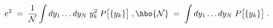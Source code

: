 \begin{equation} 
e^2 \; = \; \frac{1}{\cal N} \int dy_1 \ldots dy_N \; y_k^2 \; 
P\bigl[ \{ y_k \} \bigr] \; , \hbo 
{\cal N} \; = \; \int dy_1 \ldots dy_N \; 
P\bigl[ \{ y_k \} \bigr] \; . 
\label{eq:a2} 
\end{equation} 
